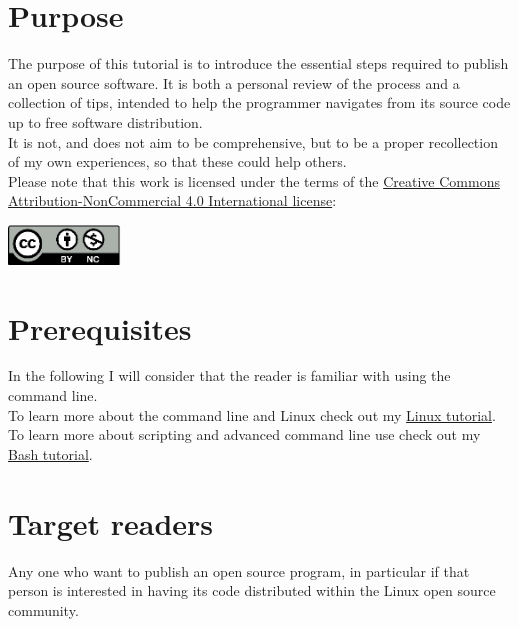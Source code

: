 \documentclass{./these-seb}
\begin{document}
\section*{Purpose}

The purpose of this tutorial is to introduce the essential steps required to publish an open source software. 
It is both a personal review of the process and a collection of tips, intended to help the programmer navigates from its source code up to free software distribution. \\
It is not, and does not aim to be comprehensive, but to be a proper recollection of my own experiences, so that these could help others. \\[0.25cm]
Please note that this work is licensed under the terms of the \href{https://creativecommons.org/licenses/by-nc/4.0/?ref=chooser-v1}{Creative Commons Attribution-NonCommercial 4.0 International license}: 
\begin{center}\includegraphics[width=3cm]{img/by-nc.eps}\end{center}

\section*{Prerequisites}

In the following I will consider that the reader is familiar with using the command line. \\
To learn more about the command line and Linux check out my \href{https://www.ipcms.fr/wp-content/uploads/2021/11/linux.pdf}{Linux tutorial}. \\
To learn more about scripting and advanced command line use check out my \href{https://www.ipcms.fr/wp-content/uploads/2021/05/bash.pdf}{Bash tutorial}. 

\section*{Target readers}

Any one who want to publish an open source program, in particular if that person is interested in having its code distributed within the Linux open source community. 
\end{document}
